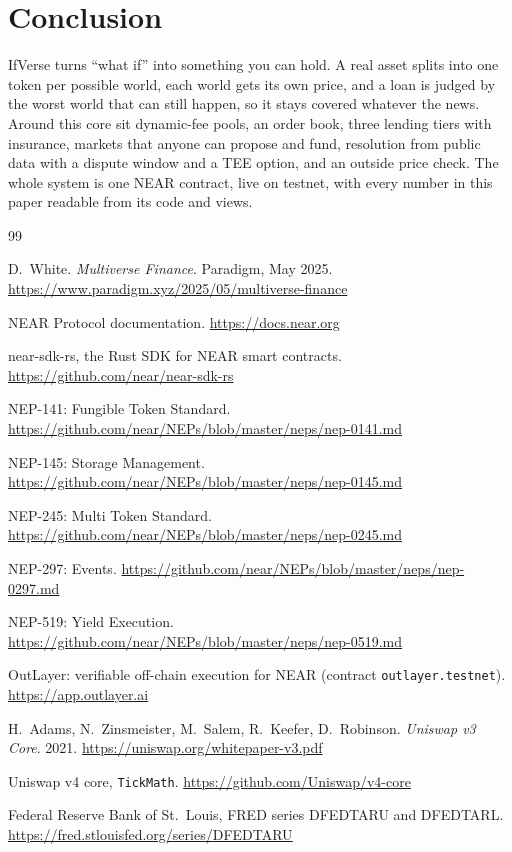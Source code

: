 \documentclass[11pt,a4paper]{article}
\newcommand{\code}[1]{\texttt{\small #1}}
\begin{document}
\section{Conclusion}

IfVerse turns ``what if'' into something you can hold. A real asset splits into one token per possible world, each
world gets its own price, and a loan is judged by the worst world that can still happen, so it stays covered whatever
the news. Around this core sit dynamic-fee pools, an order book, three lending tiers with insurance, markets that
anyone can propose and fund, resolution from public data with a dispute window and a TEE option, and an outside
price check. The whole system is one NEAR contract, live on testnet, with every number in this paper readable from
its code and views.

\begin{thebibliography}{99}
\footnotesize\raggedright
\setlength{\itemsep}{0pt}
 D.~White. \emph{Multiverse Finance}. Paradigm, May 2025.
\url{https://www.paradigm.xyz/2025/05/multiverse-finance}

 NEAR Protocol documentation. \url{https://docs.near.org}

 near-sdk-rs, the Rust SDK for NEAR smart contracts. \url{https://github.com/near/near-sdk-rs}

 NEP-141: Fungible Token Standard. \url{https://github.com/near/NEPs/blob/master/neps/nep-0141.md}

 NEP-145: Storage Management. \url{https://github.com/near/NEPs/blob/master/neps/nep-0145.md}

 NEP-245: Multi Token Standard. \url{https://github.com/near/NEPs/blob/master/neps/nep-0245.md}

 NEP-297: Events. \url{https://github.com/near/NEPs/blob/master/neps/nep-0297.md}

 NEP-519: Yield Execution. \url{https://github.com/near/NEPs/blob/master/neps/nep-0519.md}

 OutLayer: verifiable off-chain execution for NEAR (contract \code{outlayer.testnet}).
\url{https://app.outlayer.ai}

 H.~Adams, N.~Zinsmeister, M.~Salem, R.~Keefer, D.~Robinson. \emph{Uniswap v3 Core}. 2021.
\url{https://uniswap.org/whitepaper-v3.pdf}

 Uniswap v4 core, \code{TickMath}. \url{https://github.com/Uniswap/v4-core}

 Federal Reserve Bank of St.\ Louis, FRED series DFEDTARU and DFEDTARL.
\url{https://fred.stlouisfed.org/series/DFEDTARU}

\end{thebibliography}
\end{document}
